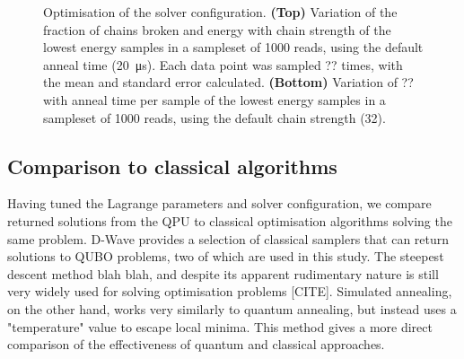 \documentclass[12pt]{article}
\theoremstyle{definition}
\begin{document}
\begin{figure}[ht]
    \centering\footnotesize
    
    \caption[Optimisation of the solver configuration.]{Optimisation of the solver configuration. \textbf{(Top)} Variation of the fraction of chains broken and energy with chain strength of the lowest energy samples in a sampleset of 1000 reads, using the default anneal time (\qty{20}{\us}). Each data point was sampled ?? times, with the mean and standard error calculated. \textbf{(Bottom)} Variation of ?? with anneal time per sample of the lowest energy samples in a sampleset of 1000 reads, using the default chain strength (\num{32}).}
    \label{fig:solver-configuration}
\end{figure}

\subsection{Comparison to classical algorithms}

Having tuned the Lagrange parameters and solver configuration, we compare returned solutions from the QPU to classical optimisation algorithms solving the same problem. D-Wave provides a selection of classical samplers that can return solutions to QUBO problems, two of which are used in this study. The steepest descent method blah blah, and despite its apparent rudimentary nature is still very widely used for solving optimisation problems [CITE]. Simulated annealing, on the other hand, works very similarly to quantum annealing, but instead uses a "temperature" value to escape local minima. This method gives a more direct comparison of the effectiveness of quantum and classical approaches.
\end{document}
